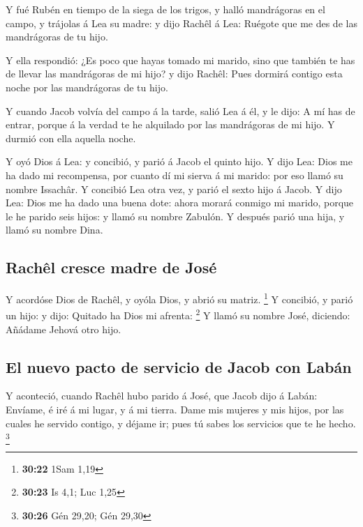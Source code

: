  Y fué Rubén en tiempo de la siega de los trigos, y halló
mandrágoras en el campo, y trájolas á Lea su madre: y dijo Rachêl á Lea:
Ruégote que me des de las mandrágoras de tu hijo.

 Y ella respondió: ¿Es poco que hayas tomado mi marido,
sino que también te has de llevar las mandrágoras de mi hijo? y dijo
Rachêl: Pues dormirá contigo esta noche por las mandrágoras de tu hijo.

 Y cuando Jacob volvía del campo á la tarde, salió Lea á
él, y le dijo: A mí has de entrar, porque á la verdad te he alquilado
por las mandrágoras de mi hijo. Y durmió con ella aquella noche.

 Y oyó Dios á Lea: y concibió, y parió á Jacob el quinto
hijo.  Y dijo Lea: Dios me ha dado mi recompensa, por
cuanto dí mi sierva á mi marido: por eso llamó su nombre Issachâr.
 Y concibió Lea otra vez, y parió el sexto hijo á Jacob.
 Y dijo Lea: Dios me ha dado una buena dote: ahora morará
conmigo mi marido, porque le he parido seis hijos: y llamó su nombre
Zabulón.  Y después parió una hija, y llamó su nombre
Dina.

\hypertarget{rachuxeal-cresce-madre-de-josuxe9}{%
\subsection{Rachêl cresce madre de
José}\label{rachuxeal-cresce-madre-de-josuxe9}}

 Y acordóse Dios de Rachêl, y oyóla Dios, y abrió su
matriz. \footnote{\textbf{30:22} 1Sam 1,19}  Y concibió,
y parió un hijo: y dijo: Quitado ha Dios mi afrenta: \footnote{\textbf{30:23}
  Is 4,1; Luc 1,25}  Y llamó su nombre José, diciendo:
Añádame Jehová otro hijo.

\hypertarget{el-nuevo-pacto-de-servicio-de-jacob-con-labuxe1n}{%
\subsection{El nuevo pacto de servicio de Jacob con
Labán}\label{el-nuevo-pacto-de-servicio-de-jacob-con-labuxe1n}}

 Y aconteció, cuando Rachêl hubo parido á José, que Jacob
dijo á Labán: Envíame, é iré á mi lugar, y á mi tierra. 
Dame mis mujeres y mis hijos, por las cuales he servido contigo, y
déjame ir; pues tú sabes los servicios que te he hecho. \footnote{\textbf{30:26}
  Gén 29,20; Gén 29,30}

